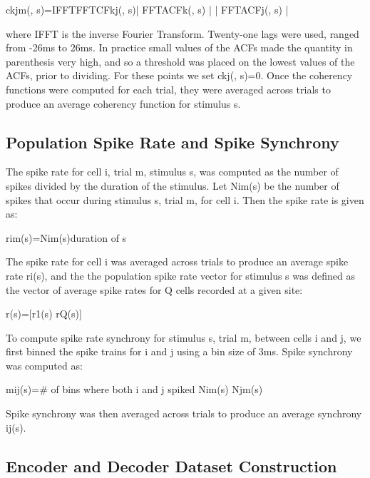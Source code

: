 ckjm(, s)=IFFTFFTCFkj(, s)| FFTACFk(, s) |  | FFTACFj(, s) |

where IFFT is the inverse Fourier Transform. Twenty-one lags were used,  ranged from -26ms to 26ms. In practice small values of the ACFs made the quantity in parenthesis very high, and so a threshold was placed on the lowest values of the ACFs, prior to dividing. For these points we set ckj(, s)=0.  Once the coherency functions were computed for each trial, they were averaged across trials to produce an average coherency function for stimulus s.

\subsection{Population Spike Rate and Spike Synchrony}

    The spike rate for cell i, trial m, stimulus s, was computed as the number of spikes divided by the duration of the stimulus. Let Nim(s) be the number of spikes that occur during stimulus s, trial m, for cell i. Then the spike rate is given as:

rim(s)=Nim(s)duration of s

The spike rate for cell i was averaged across trials to produce an average spike rate ri(s), and the the population spike rate vector for stimulus s was defined as the vector of average spike rates for Q cells recorded at a given site:

r(s)=[r1(s)    rQ(s)]

    To compute spike rate synchrony for stimulus s, trial m, between cells i and j, we first binned the spike trains for i and j using a bin size of 3ms. Spike synchrony was computed as:

mij(s)=\# of bins where both i and j spiked Nim(s)  Njm(s)

Spike synchrony was then averaged across trials to produce an average synchrony ij(s).

\subsection{Encoder and Decoder Dataset Construction}


